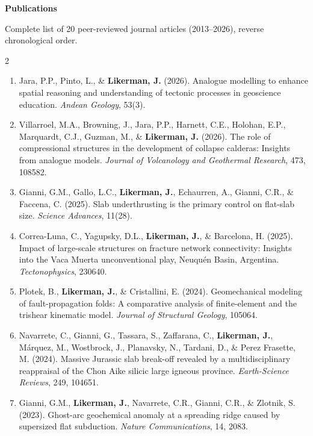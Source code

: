 \documentclass[10pt,a4paper]{../awesome-cv}
\makeatletter
\renewcommand*{\sectionstyle}[1]{{\fontsize{12.5pt}{15pt}\bodyfont\bfseries\color{text}\@sectioncolor #1}}
\renewcommand*{\descriptionstyle}[1]{{\fontsize{8.8pt}{11.2pt}\bodyfontlight\upshape\color{text} #1}}
\renewcommand{\cvsection}[1]{%
  \par\vspace{3mm}%
  \sectionstyle{#1}%
  \phantomsection%
  \color{gray}\vhrulefill{0.9pt}%
  \par\nobreak\vspace{1.8mm}%
}
\makeatother
\begin{document}
\cvsection{Publications}
\descriptionstyle{Complete list of 20 peer-reviewed journal articles (2013--2026), reverse chronological order.}\par
\vspace{0.8mm}
{\fontsize{7.6pt}{9.6pt}\bodyfontlight\color{text}
\begin{multicols}{2}
\begin{enumerate}
  \setlength{\itemsep}{0.5mm}
  \item Jara, P.P., Pinto, L., \& \textbf{Likerman, J.} (2026). Analogue modelling to enhance spatial reasoning and understanding of tectonic processes in geoscience education. \emph{Andean Geology}, 53(3).
  \item Villarroel, M.A., Browning, J., Jara, P.P., Harnett, C.E., Holohan, E.P., Marquardt, C.J., Guzman, M., \& \textbf{Likerman, J.} (2026). The role of compressional structures in the development of collapse calderas: Insights from analogue models. \emph{Journal of Volcanology and Geothermal Research}, 473, 108582.
  \item Gianni, G.M., Gallo, L.C., \textbf{Likerman, J.}, Echaurren, A., Gianni, C.R., \& Faccena, C. (2025). Slab underthrusting is the primary control on flat-slab size. \emph{Science Advances}, 11(28).
  \item Correa-Luna, C., Yagupsky, D.L., \textbf{Likerman, J.}, \& Barcelona, H. (2025). Impact of large-scale structures on fracture network connectivity: Insights into the Vaca Muerta unconventional play, Neuquén Basin, Argentina. \emph{Tectonophysics}, 230640.
  \item Plotek, B., \textbf{Likerman, J.}, \& Cristallini, E. (2024). Geomechanical modeling of fault-propagation folds: A comparative analysis of finite-element and the trishear kinematic model. \emph{Journal of Structural Geology}, 105064.
  \item Navarrete, C., Gianni, G., Tassara, S., Zaffarana, C., \textbf{Likerman, J.}, Márquez, M., Wostbrock, J., Planavsky, N., Tardani, D., \& Perez Frasette, M. (2024). Massive Jurassic slab break-off revealed by a multidisciplinary reappraisal of the Chon Aike silicic large igneous province. \emph{Earth-Science Reviews}, 249, 104651.
  \item Gianni, G.M., \textbf{Likerman, J.}, Navarrete, C.R., Gianni, C.R., \& Zlotnik, S. (2023). Ghost-arc geochemical anomaly at a spreading ridge caused by supersized flat subduction. \emph{Nature Communications}, 14, 2083.

\end{enumerate}
\end{multicols}}
\end{document}
